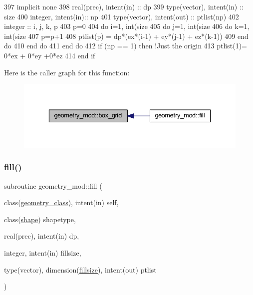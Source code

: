\begin{DoxyCode}
397     \textcolor{keywordtype}{implicit none}
398     \textcolor{keywordtype}{real(prec)}, \textcolor{keywordtype}{intent(in)} :: dp
399     \textcolor{keywordtype}{type}(vector), \textcolor{keywordtype}{intent(in)} :: size
400     \textcolor{keywordtype}{integer}, \textcolor{keywordtype}{intent(in)}::  np
401     \textcolor{keywordtype}{type}(vector), \textcolor{keywordtype}{intent(out)} :: ptlist(np)
402     \textcolor{keywordtype}{integer} :: i, j, k, p
403     p=0
404     \textcolor{keywordflow}{do} i=1, int(size%
405         \textcolor{keywordflow}{do} j=1, int(size%
406             \textcolor{keywordflow}{do} k=1, int(size%
407                 p=p+1
408                 ptlist(p) = dp*(ex*(i-1) + ey*(j-1) + ez*(k-1))
409 \textcolor{keywordflow}{            end do}
410 \textcolor{keywordflow}{        end do}
411 \textcolor{keywordflow}{    end do}
412     \textcolor{keywordflow}{if} (np == 1) \textcolor{keywordflow}{then} \textcolor{comment}{!Just the origin}
413         ptlist(1)= 0*ex + 0*ey +0*ez
414 \textcolor{keywordflow}{    end if}
\end{DoxyCode}
Here is the caller graph for this function\+:\nopagebreak
\begin{figure}[H]
\begin{center}
\leavevmode
\includegraphics[width=336pt]{namespacegeometry__mod_ae87e4ecff2d21a839da2b82919b5fd0b_icgraph}
\end{center}
\end{figure}
\mbox{\label{namespacegeometry__mod_a1d97564e04562532b5389bfb91aa676b}} 
\subsubsection{\texorpdfstring{fill()}{fill()}}
{\footnotesize\ttfamily subroutine geometry\+\_\+mod\+::fill (\begin{DoxyParamCaption}\item[{class(\mbox{\hyperlink{structgeometry__mod_1_1geometry__class}{geometry\+\_\+class}}), intent(in)}]{self,  }\item[{class(\mbox{\hyperlink{structgeometry__mod_1_1shape}{shape}})}]{shapetype,  }\item[{real(prec), intent(in)}]{dp,  }\item[{integer, intent(in)}]{fillsize,  }\item[{type(vector), dimension(\mbox{\hyperlink{namespacegeometry__mod_ad790edd694561b33dad20cfa3a14e8f2}{fillsize}}), intent(out)}]{ptlist }\end{DoxyParamCaption})\hspace{0.3cm}{\ttfamily [private]}}



